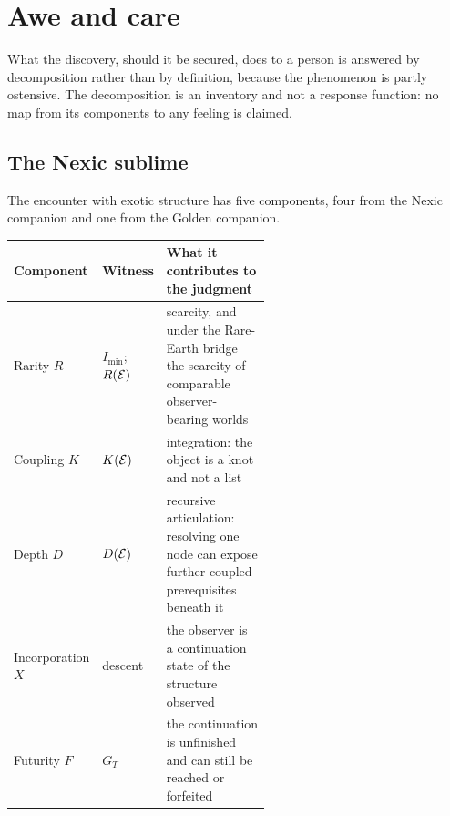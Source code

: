 \section{Awe and care}\label{sec:sublime}

What the discovery, should it be secured, does to a person is answered by
decomposition rather than by definition, because the phenomenon is partly
ostensive. The decomposition is an inventory and not a response function: no
map from its components to any feeling is claimed.

\subsection*{The Nexic sublime}

The encounter with exotic structure has five components, four from the Nexic
companion and one from the Golden companion.

\begin{center}\small
\begin{tabular}{@{}llp{0.56\linewidth}@{}}
\toprule
Component & Witness & What it contributes to the judgment\\
\midrule
Rarity $R$ & $I_{\min}$; $R(\mathcal{E})$ & scarcity, and under the Rare-Earth bridge the scarcity of comparable observer-bearing worlds\\
Coupling $K$ & $K(\mathcal{E})$ & integration: the object is a knot and not a list\\
Depth $D$ & $D(\mathcal{E})$ & recursive articulation: resolving one node can expose further coupled prerequisites beneath it\\
Incorporation $X$ & descent & the observer is a continuation state of the structure observed\\
Futurity $F$ & $G_T$ & the continuation is unfinished and can still be reached or forfeited\\
\bottomrule
\end{tabular}
\end{center}

